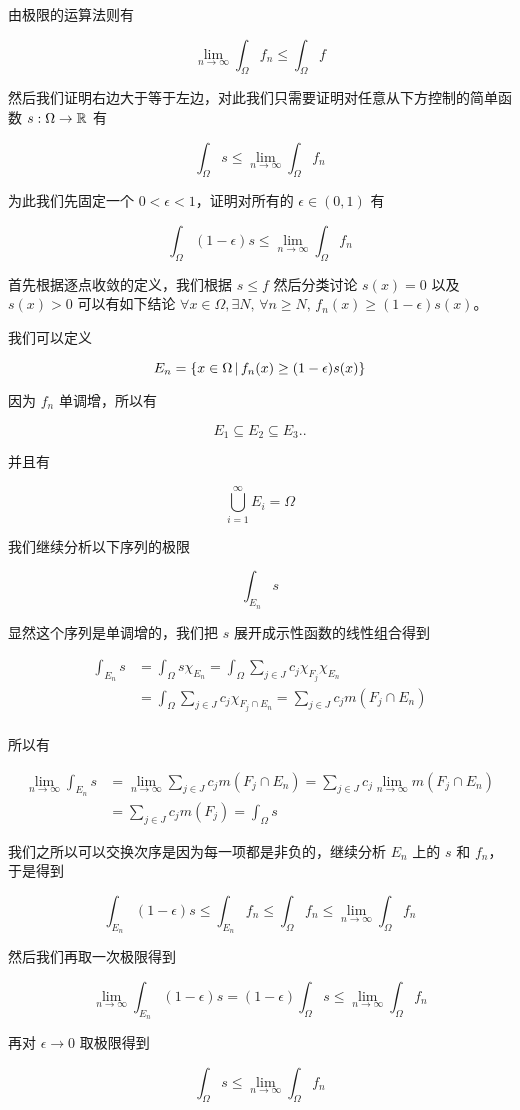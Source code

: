 由极限的运算法则有

\[
\lim_{n \to \infty}\int_{\Omega} f_n \le \int_{\Omega} f
\]

然后我们证明右边大于等于左边，对此我们只需要证明对任意从下方控制的简单函数 $s: \Omega \to \mathbb{R}$ 有

\[
    \int_{\Omega} s \le \lim_{n \to \infty} \int_{\Omega} f_n
\]

为此我们先固定一个 $ 0 < \epsilon < 1$，证明对所有的 $\epsilon \in (0,1)$ 有

\[
    \int_{\Omega} (1-\epsilon)s \le \lim_{n \to \infty} \int_{\Omega} f_n
\]

首先根据逐点收敛的定义，我们根据 $s \le f$ 然后分类讨论 $s(x) = 0$ 以及 $s(x) > 0$ 可以有如下结论 $\forall x \in \Omega, \exists N,\, \forall n \ge N,\, f_n(x) \ge (1-\epsilon)s(x)$。

我们可以定义 

\[
E_n = \{ x \in \Omega \,\vert\, f_n(x) \ge (1-\epsilon)s(x)\}
\]

因为 $f_n$ 单调增，所以有

\[
E_1 \subseteq E_2 \subseteq E_3 .. 
\]

并且有

\[
\bigcup_{i=1}^{\infty} E_i = \Omega
\]

我们继续分析以下序列的极限

\[
\int_{E_n}s
\]

显然这个序列是单调增的，我们把 $s$ 展开成示性函数的线性组合得到

\begin{align*}
\int_{E_n} s &= \int_{\Omega}s \chi_{E_n} = \int_{\Omega} \sum_{j \in J} c_j \chi_{F_j} \chi_{E_n} \\
 & = \int_{\Omega} \sum_{j \in J} c_j \chi_{F_j \cap E_n}  = \sum_{j \in J} c_j m(F_j \cap E_n)  \\
\end{align*}

所以有

\begin{align*}
\lim_{n \to \infty}\int_{E_n} s &= \lim_{n \to \infty}\sum_{j \in J} c_j m(F_j \cap E_n) = \sum_{j \in J}c_j\lim_{n \to \infty}m(F_j \cap E_n) \\
    & = \sum_{j \in J}c_j m(F_j) = \int_{\Omega} s
\end{align*}

我们之所以可以交换次序是因为每一项都是非负的，继续分析 $E_n$ 上的 $s$ 和 $f_n$，于是得到

\[
    \int_{E_n}(1-\epsilon)s \le \int_{E_n} f_n \le \int_{\Omega} f_n \le \lim_{n \to \infty} \int_{\Omega} f_n
\]

然后我们再取一次极限得到

\[
\lim_{n \to \infty}\int_{E_n}(1-\epsilon)s = (1-\epsilon)\int_{\Omega} s \le \lim_{n \to \infty} \int_{\Omega} f_n
\]

再对 $\epsilon \to 0$ 取极限得到


\[
\int_{\Omega} s \le \lim_{n \to \infty} \int_{\Omega} f_n
\]